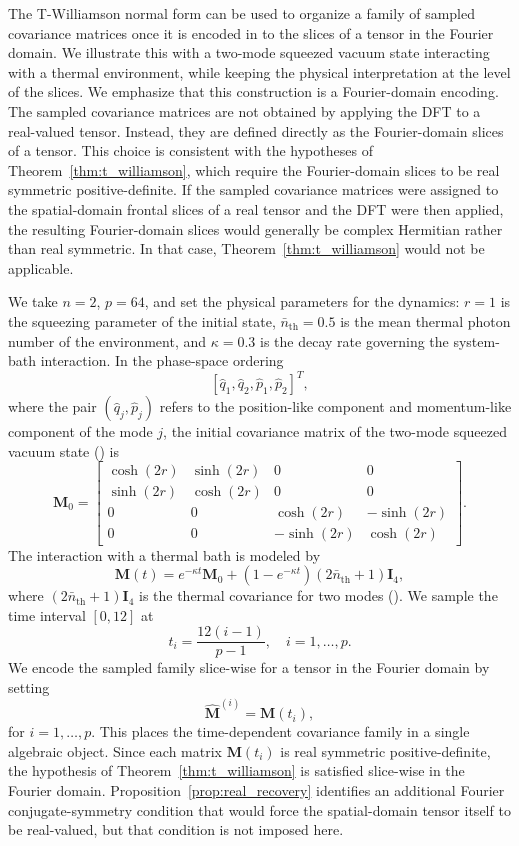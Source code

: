 \documentclass[pdflatex,sn-mathphys-ay]{sn-jnl}
\newcommand{\M}[1]{\bm{#1}}     %
\theoremstyle{thmstyleone}
\theoremstyle{thmstyletwo}
\theoremstyle{thmstylethree}
\numberwithin{equation}{section}
\begin{document}
The T-Williamson normal form can be used to organize a family of sampled covariance matrices once it is encoded in to the slices of a tensor in the Fourier domain.  We illustrate this with a two-mode squeezed vacuum state interacting with a thermal environment, while keeping the physical interpretation at the level of the slices. 
We emphasize that this construction is a Fourier-domain encoding. 
The sampled covariance matrices are not obtained by applying the DFT to a real-valued tensor. 
Instead, they are defined directly as the Fourier-domain slices of a tensor. 
This choice is consistent with the hypotheses of Theorem~\ref{thm:t_williamson}, which require the Fourier-domain slices to be real symmetric positive-definite. 
If the sampled covariance matrices were assigned to the spatial-domain frontal slices of a real tensor and the DFT were then applied, the resulting Fourier-domain slices would generally be complex Hermitian rather than real symmetric. 
In that case, Theorem~\ref{thm:t_williamson} would not be applicable.

We take $n=2$, $p=64$, and set the physical parameters for the dynamics: $r=1$ is the squeezing parameter of the initial state, $\bar{n}_{\text{th}}=0.5$ is the mean thermal photon number of the environment, and $\kappa=0.3$ is the decay rate governing the system-bath interaction.
In the phase-space ordering
$$
[\hat{q}_1,\hat{q}_2,\hat{p}_1,\hat{p}_2]^T,
$$
where the pair $(\hat{q}_j,\hat{p}_j)$ refers to the position-like component and momentum-like component of the mode $j$, the initial covariance matrix of the two-mode squeezed vacuum state (\cite{weedbrook2012gaussian}) is
$$
\M{M}_0 = \begin{bmatrix}
\cosh(2r) & \sinh(2r) & 0 & 0 \\
\sinh(2r) & \cosh(2r) & 0 & 0 \\
0 & 0 & \cosh(2r) & -\sinh(2r) \\
0 & 0 & -\sinh(2r) & \cosh(2r)
\end{bmatrix}.
$$
The interaction with a thermal bath is modeled by
$$
\M{M}(t) = e^{-\kappa t} \M{M}_0 + (1 - e^{-\kappa t}) (2\bar{n}_{\text{th}} + 1)\M{I}_4,
$$
where $(2\bar{n}_{\text{th}} + 1)\M{I}_4$ is the thermal covariance for two modes (\cite{weedbrook2012gaussian}). 
We sample the time interval $[0,12]$ at
$$
t_i = \frac{12(i-1)}{p-1},
\quad i=1,\dots,p.
$$
We encode the sampled family slice-wise for a tensor in the Fourier domain by setting
$$
\widehat{\M{M}}^{(i)} = \M{M}(t_i),
$$
for $i=1,\dots,p.$ This places the time-dependent covariance family in a single algebraic object. Since each matrix $\M{M}(t_i)$ is real symmetric positive-definite, the hypothesis of Theorem~\ref{thm:t_williamson} is satisfied slice-wise in the Fourier domain. Proposition~\ref{prop:real_recovery} identifies an additional Fourier conjugate-symmetry condition that would force the spatial-domain tensor itself to be real-valued, but that condition is not imposed here.
\end{document}
